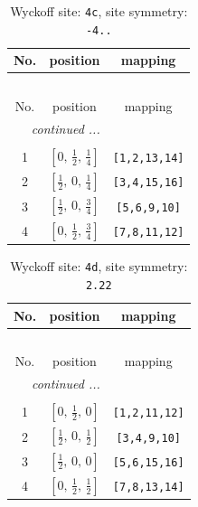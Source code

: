 \documentclass[fleqn,8pt]{jsarticle}
\begin{document}
\renewcommand{\arraystretch}{1.2}
\begin{longtable}{ccc}
\caption{Wyckoff site: {\tt 4c}, site symmetry: {\tt -4..}}
 \\
 \hline \hline
No. & position & mapping \\ \hline \endfirsthead

\multicolumn{2}{l}{\tablename\ \thetable{}} \\
 \hline \hline
No. & position & mapping \\ \hline \endhead

 \hline \hline
\multicolumn{2}{r}{\footnotesize\it continued ...} \\ \endfoot

 \hline \hline
\multicolumn{2}{r}{} \\ \endlastfoot

1 & $\left[ 0,\, \frac{1}{2},\, \frac{1}{4} \right]$ & {\tt [1,2,13,14]} \\ \hline
2 & $\left[ \frac{1}{2},\, 0,\, \frac{1}{4} \right]$ & {\tt [3,4,15,16]} \\ \hline
3 & $\left[ \frac{1}{2},\, 0,\, \frac{3}{4} \right]$ & {\tt [5,6,9,10]} \\ \hline
4 & $\left[ 0,\, \frac{1}{2},\, \frac{3}{4} \right]$ & {\tt [7,8,11,12]} \\
\end{longtable}
\renewcommand{\arraystretch}{1.2}
\begin{longtable}{ccc}
\caption{Wyckoff site: {\tt 4d}, site symmetry: {\tt 2.22}}
 \\
 \hline \hline
No. & position & mapping \\ \hline \endfirsthead

\multicolumn{2}{l}{\tablename\ \thetable{}} \\
 \hline \hline
No. & position & mapping \\ \hline \endhead

 \hline \hline
\multicolumn{2}{r}{\footnotesize\it continued ...} \\ \endfoot

 \hline \hline
\multicolumn{2}{r}{} \\ \endlastfoot

1 & $\left[ 0,\, \frac{1}{2},\, 0 \right]$ & {\tt [1,2,11,12]} \\ \hline
2 & $\left[ \frac{1}{2},\, 0,\, \frac{1}{2} \right]$ & {\tt [3,4,9,10]} \\ \hline
3 & $\left[ \frac{1}{2},\, 0,\, 0 \right]$ & {\tt [5,6,15,16]} \\ \hline
4 & $\left[ 0,\, \frac{1}{2},\, \frac{1}{2} \right]$ & {\tt [7,8,13,14]} \\
\end{longtable}
\end{document}
